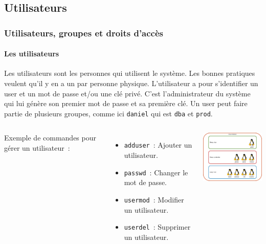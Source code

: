 \documentclass{beamer}
\begin{document}
    \subsection{Utilisateurs}\label{subsec:utilisateurs}
    \begin{frame}
        \transdissolve
        \frametitle{Utilisateurs, groupes et droits d'accès}
        \framesubtitle{Les utilisateurs}
        Les utilisateurs sont les personnes qui utilisent le système.
        Les bonnes pratiques veulent qu'il y en a un par personne physique.
        L'utilisateur a pour s'identifier un user et un mot de passe et/ou une clé privé.
        C'est l'administrateur du système qui lui génère son premier mot de passe et sa première clé.
        Un user peut faire partie de plusieurs groupes, comme ici \lstinline{daniel} qui est \lstinline{dba} et \lstinline{prod}.
        \begin{columns}
            Exemple de commandes pour gérer un utilisateur~:
            \begin{itemize}
                \item \lstinline{adduser}~: Ajouter un utilisateur.
                \item \lstinline{passwd}~: Changer le mot de passe.
                \item \lstinline{usermod}~: Modifier un utilisateur.
                \item \lstinline{userdel}~: Supprimer un utilisateur.
            \end{itemize}
            \centering
            \includegraphics[width=5cm]{image/groups-and-users.drawio}
        \end{columns}
    \end{frame}
\end{document}
